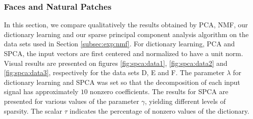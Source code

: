 \documentclass[twoside,11pt]{article}
\begin{document}
\subsubsection{Faces and Natural Patches} \label{subsubsec:patches}
In this section, we compare qualitatively the results obtained by PCA, NMF,
our dictionary learning and our sparse principal component analysis algorithm on the
data sets used in Section \ref{subsec:exp:nmf}. 
For dictionary learning, PCA and SPCA, the input vectors are first centered
and normalized to have a unit norm. Visual results are presented on figures
\ref{fig:spca:data1}, \ref{fig:spca:data2} and \ref{fig:spca:data3}, respectively
for the data sets D, E and F.
The parameter $\lambda$ for dictionary learning and SPCA was set so that the
decomposition of each input signal has approximately $10$ nonzero coefficients.
The results for SPCA are presented for various values of the parameter
$\gamma$, yielding different levels of sparsity. The scalar $\tau$ indicates
the percentage of nonzero values of the dictionary.
\end{document}
